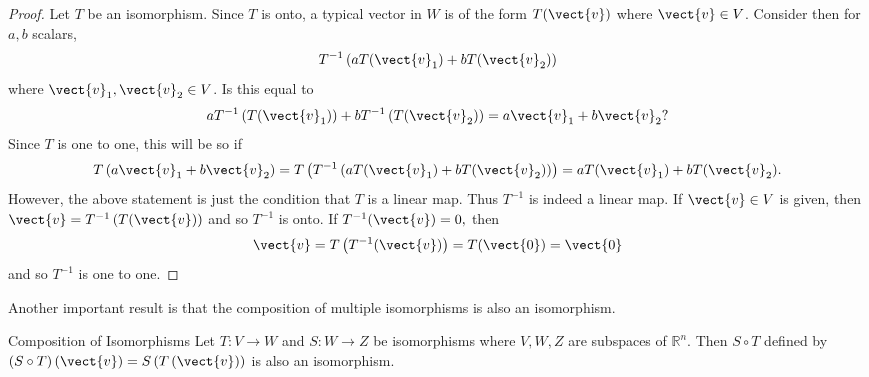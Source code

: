 \begin{proof} Let $T$ be an isomorphism.  Since $T$ is onto, a typical
vector in $W$ is of the form $T(\vect{v})$ where $\vect{v} \in V$. Consider then for $a,b$
scalars, 
\begin{equation*}
T^{-1}\left( aT(\vect{v}_{1})+bT(\vect{v}_{2})\right)
\end{equation*}
where $\vect{v}_{1}, \vect{v}_2 \in V$. Is this equal to 
\begin{equation*}
aT^{-1}\left( T (\vect{v}_{1})\right) +bT^{-1}\left( T(\vect{v}_{2})\right) =a\vect{v}_{1}+b\vect{v}_{2}?
\end{equation*}
Since $T$ is one to one, this will be so if 
\begin{equation*}
T\left( a\vect{v}_{1}+b\vect{v}_{2}\right) =T\left( T^{-1}\left( aT(\vect{v}_{1})+bT(\vect{v}_{2})\right)
\right) =aT(\vect{v}_{1})+bT(\vect{v}_{2}).
\end{equation*}
However, the above statement is just the condition that $T$ is a linear map.
Thus $T^{-1}$ is indeed a linear map. If $\vect{v} \in V$ is given, then $\vect{v}=T^{-1}\left( T(\vect{v})\right) $ and so $T^{-1}$ is onto. If $T^{-1} (\vect{v})=0,$ then 
\begin{equation*}
\vect{v}=T\left( T^{-1}(\vect{v})\right) =T(\vect{0})=\vect{0}
\end{equation*}
and so $T^{-1}$ is one to one.
\end{proof}

Another important result is that the composition of multiple isomorphisms is also an isomorphism.

\begin{proposition}{Composition of Isomorphisms}\label{prop:compositionisomorphisms}
Let $T:V\rightarrow W$ and  $S:W\rightarrow Z$ be isomorphisms where $V,W,Z$ are subspaces of $\mathbb{R}^n$. Then $S\circ
T $ defined by $\left( S\circ T\right) \left( \vect{v} \right) = S\left(
T\left( \vect{v} \right) \right) $ is also an isomorphism.
\end{proposition}

